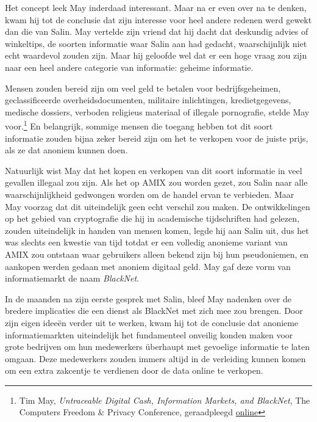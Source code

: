 \documentclass[
  a5paper,
  smalldemyvopaper,11pt,twoside,onecolumn,openright,extrafontsizes,
hidelinks]{memoir}
\begin{document}
Het concept leek May inderdaad interessant. Maar na er even over na te
denken, kwam hij tot de conclusie dat zijn interesse voor heel andere
redenen werd gewekt dan die van Salin. May vertelde zijn vriend dat hij
dacht dat deskundig advies of winkeltips, de soorten informatie waar
Salin aan had gedacht, waarschijnlijk niet echt waardevol zouden zijn.
Maar hij geloofde wel dat er een hoge vraag zou zijn naar een heel
andere categorie van informatie: geheime informatie.

Mensen zouden bereid zijn om veel geld te betalen voor bedrijfsgeheimen,
geclassificeerde overheidsdocumenten, militaire inlichtingen,
kredietgegevens, medische dossiers, verboden religieus materiaal of
illegale pornografie, stelde May voor.\footnote{Tim May,
  \emph{Untraceable Digital Cash, Information Markets, and BlackNet},
  The Computers Freedom \& Privacy Conference, geraadpleegd
  \href{https://web.archive.org/web/20130501134401/https://osaka.law.miami.edu//~froomkin/articles/tcmay.htm}{online}}
En belangrijk, sommige mensen die toegang hebben tot dit soort
informatie zouden bijna zeker bereid zijn om het te verkopen voor de
juiste prijs, als ze dat anoniem kunnen doen.

Natuurlijk wist May dat het kopen en verkopen van dit soort informatie
in veel gevallen illegaal zou zijn. Als het op AMIX zou worden gezet,
zou Salin naar alle waarschijnlijkheid gedwongen worden om de handel
ervan te verbieden. Maar May voorzag dat dit uiteindelijk geen echt
verschil zou maken. De ontwikkelingen op het gebied van cryptografie die
hij in academische tijdschriften had gelezen, zouden uiteindelijk in
handen van mensen komen, legde hij aan Salin uit, dus het was slechts
een kwestie van tijd totdat er een volledig anonieme variant van AMIX
zou ontstaan waar gebruikers alleen bekend zijn bij hun pseudoniemen, en
aankopen werden gedaan met anoniem digitaal geld. May gaf deze vorm van
informatiemarkt de naam \emph{BlackNet}.

In de maanden na zijn eerste gesprek met Salin, bleef May nadenken over
de bredere implicaties die een dienst als BlackNet met zich mee zou
brengen. Door zijn eigen ideeën verder uit te werken, kwam hij tot de
conclusie dat anonieme informatiemarkten uiteindelijk het fundamenteel
onveilig konden maken voor grote bedrijven om hun medewerkers überhaupt
met gevoelige informatie te laten omgaan. Deze medewerkers zouden immers
altijd in de verleiding kunnen komen om een extra zakcentje te verdienen
door de data online te verkopen.
\end{document}
